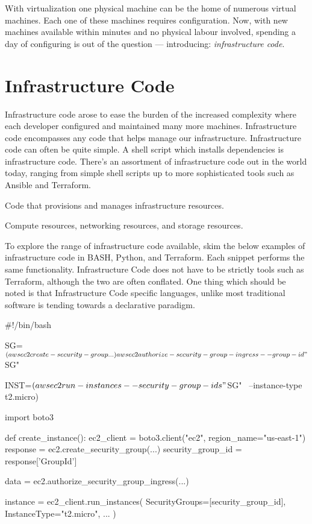 With virtualization one physical machine can be the home of numerous virtual machines.
Each one of these machines requires configuration.
Now, with new machines available within minutes and no physical labour involved,
spending a day of configuring is out of the question
--- introducing: \textsl{infrastructure code}.

\section{Infrastructure Code}

Infrastructure code arose to ease the burden of the increased complexity where each developer configured and maintained many more machines.
Infrastructure code encompasses any code that helps manage our infrastructure.
Infrastructure code can often be quite simple.
A shell script which installs dependencies is infrastructure code.
There's an assortment of infrastructure code out in the world today, ranging from simple shell scripts up to more sophisticated tools such as Ansible and Terraform.

\begin{definition}
Code that provisions and manages infrastructure resources.
\end{definition}

\begin{definition}
Compute resources, networking resources, and storage resources.
\end{definition}

To explore the range of infrastructure code available, skim the below examples of infrastructure code in BASH, Python, and Terraform.
Each snippet performs the same functionality.
Infrastructure Code does not have to be strictly tools such as Terraform,
although the two are often conflated.
One thing which should be noted is that Infrastructure Code specific languages,
unlike most traditional software is tending towards a declarative paradigm.

\begin{code}[language=bash]{}
#!/bin/bash

SG=$(aws ec2 create-security-group ...)

aws ec2 authorize-security-group-ingress --group-id "$SG"

INST=$(aws ec2 run-instances --security-group-ids "$SG" \
            --instance-type t2.micro)
\end{code}

\begin{code}[language=python]{}
import boto3

def create_instance():
    ec2_client = boto3.client("ec2", region_name="us-east-1")
    response = ec2.create_security_group(...)
    security_group_id = response['GroupId']

    data = ec2.authorize_security_group_ingress(...)

    instance = ec2_client.run_instances(
        SecurityGroups=[security_group_id],
        InstanceType="t2.micro",
        ...
    )
\end{code}

